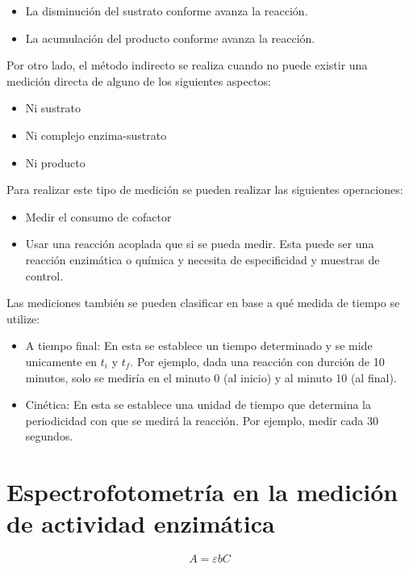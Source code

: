 \begin{itemize}
    \item La disminución del sustrato conforme avanza la reacción.
    \item La acumulación del producto conforme avanza la reacción.
\end{itemize}

Por otro lado, el método indirecto se realiza cuando no puede existir una medición directa de alguno de los siguientes aspectos:

\begin{itemize}
    \item Ni sustrato
    \item Ni complejo enzima-sustrato
    \item Ni producto
\end{itemize}

Para realizar este tipo de medición se pueden realizar las siguientes operaciones:

\begin{itemize}
    \item Medir el consumo de cofactor
    
    \item Usar una reacción acoplada que si se pueda medir. Esta puede ser una reacción enzimática o química y necesita de especificidad y muestras de control.
\end{itemize}

Las mediciones también se pueden clasificar en base a qué medida de tiempo se utilize:

\begin{itemize}
    \item A tiempo final: En esta se establece un tiempo determinado y se mide unicamente en $t_i$ y $t_f$. Por ejemplo, dada una reacción con durción de 10 minutos, solo se mediría en el minuto 0 (al inicio) y al minuto 10 (al final).\cite{lopezComparacionMetodosQue2017}
    \item Cinética: En esta se establece una unidad de tiempo que determina la periodicidad con que se medirá la reacción. Por ejemplo, medir cada 30 segundos. 
\end{itemize}

\section{Espectrofotometría en la medición de actividad enzimática}

\begin{equation}
    A = \varepsilon b C
\end{equation}

